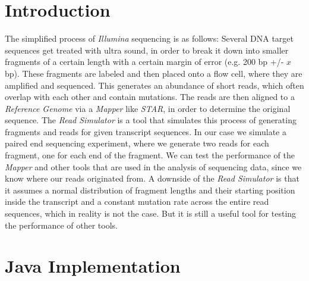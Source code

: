 \documentclass[12pt]{article}
\begin{document}
\section{Introduction}
The simplified process of \textit{Illumina} sequencing is as follows:
Several DNA target sequences get treated with ultra sound,
in order to break it down into smaller fragments of a certain length with a certain margin of error (e.g. 200 bp +/- $x$ bp).
These fragments are labeled and then placed onto a flow cell, where they are amplified and sequenced.
This generates an abundance of short reads, which often overlap with each other and contain mutations.
The reads are then aligned to a \textit{Reference Genome} via a \textit{Mapper} like \textit{STAR}, in order to determine the original sequence.
The \textit{Read Simulator} is a tool that simulates this process of generating fragments and reads for given transcript sequences.
In our case we simulate a paired end sequencing experiment, where we generate two reads for each fragment, one for each end of the fragment.
We can test the performance of the \textit{Mapper} and other tools that are used in the analysis of sequencing data,
since we know where our reads originated from.
A downside of the \textit{Read Simulator} is that it assumes a normal distribution of fragment lengths and
their starting position inside the transcript
and a constant mutation rate across the entire read sequences, which in reality is not the case.
But it is still a useful tool for testing the performance of other tools.
\newpage


\section{Java Implementation}
\end{document}
